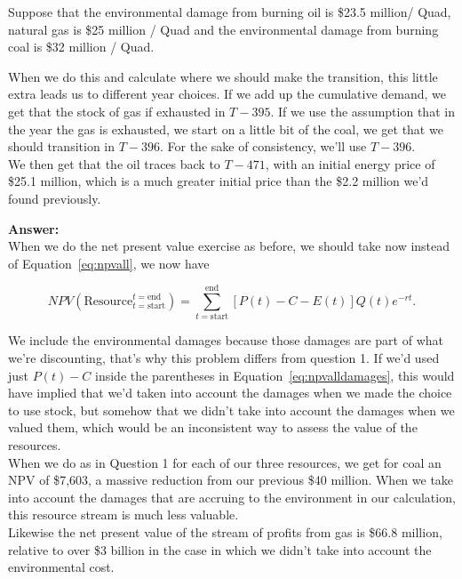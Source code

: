 \begin{enumerate}
\begin{Exercise}{Suppose that the environmental damage from burning oil is \$23.5 million/ Quad, natural gas is \$25 million / Quad and the environmental damage from burning coal is \$32 million / Quad.}
\begin{sol}
        When we do this and calculate where we should make the transition, this little extra leads us to different year choices. If we add up the cumulative demand, we get that the stock of gas if exhausted in $T-395$. If we use the assumption that in the year the gas is exhausted, we start on a little bit of the coal, we get that we should transition in $T-396$. For the sake of consistency, we'll use $T-396$.\\
        
        We then get that the oil traces back to $T-471$, with an initial energy price of \$25.1 million, which is a much greater initial price than the \$2.2 million we'd found previously.
        
        
        
    \end{sol} 
    
     \begin{sol}
         \textbf{Answer:}\\
          When we do the net present value exercise as before, we should take now instead of Equation~\eqref{eq:npvall}, we now have

    \begin{equation}
        NPV(\text{Resource}_{t=\text{start}}^{t=\text{end}}) = \sum_{t=\text{start}}^{\text{end}} [P(t)-C-E(t)]Q(t)e^{-rt}.
        \label{eq:npvalldamages}
    \end{equation}
    
    We include the environmental damages because those damages are part of what we're discounting, that's why this problem differs from question 1. If we'd used just $P(t)-C$ inside the parentheses in Equation~\eqref{eq:npvalldamages}, this would have implied that we'd taken into account the damages when we made the choice to use stock, but somehow that we didn't take into account the damages when we valued them, which would be an inconsistent way to assess the value of the resources.\\
    
    When we do as in Question 1 for each of our three resources, we get for coal an NPV of \$7,603, a massive reduction from our previous \$40 million. When we take into account the damages that are accruing to the environment in our calculation, this resource stream is much less valuable.\\
    
    Likewise the net present value of the stream of profits from gas is \$66.8 million, relative to over \$3 billion in the case in which we didn't take into account the environmental cost.\\
    

\end{sol}
\end{Exercise}
\end{enumerate}
